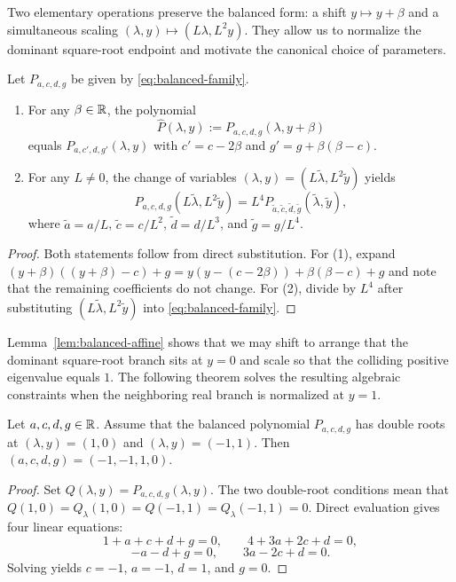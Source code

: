 Two elementary operations preserve the balanced form: a shift \(y\mapsto y+\beta\) and a simultaneous scaling \((\lambda,y)\mapsto(L\lambda,L^2 y)\).
They allow us to normalize the dominant square-root endpoint and motivate the canonical choice of parameters.

\begin{lemma}\label{lem:balanced-affine}
Let $P_{a,c,d,g}$ be given by \eqref{eq:balanced-family}.
\begin{enumerate}
\item For any $\beta\in\mathbb{R}$, the polynomial
\[
\widehat P(\lambda,y):=P_{a,c,d,g}(\lambda,y+\beta)
\]
equals $P_{a,c',d,g'}(\lambda,y)$ with $c'=c-2\beta$ and $g'=g+\beta(\beta-c)$.
\item For any $L\neq 0$, the change of variables $(\lambda,y)=(L\widetilde\lambda,L^2\widetilde y)$ yields
\[
P_{a,c,d,g}(L\widetilde\lambda,L^2\widetilde y)=L^4 P_{\widetilde a,\widetilde c,\widetilde d,\widetilde g}(\widetilde\lambda,\widetilde y),
\]
where $\widetilde a=a/L$, $\widetilde c=c/L^2$, $\widetilde d=d/L^3$, and $\widetilde g=g/L^4$.
\end{enumerate}
\end{lemma}

\begin{proof}
Both statements follow from direct substitution.
For (1), expand $(y+\beta)((y+\beta)-c)+g=y(y-(c-2\beta))+\beta(\beta-c)+g$ and note that the remaining coefficients do not change.
For (2), divide by $L^4$ after substituting $(L\widetilde\lambda,L^2\widetilde y)$ into \eqref{eq:balanced-family}.
\end{proof}

Lemma~\ref{lem:balanced-affine} shows that we may shift to arrange that the dominant square-root branch sits at $y=0$ and scale so that the colliding positive eigenvalue equals $1$.
The following theorem solves the resulting algebraic constraints when the neighboring real branch is normalized at $y=1$.

\begin{theorem}\label{thm:balanced-classification}
Let $a,c,d,g\in\mathbb{R}$.
Assume that the balanced polynomial $P_{a,c,d,g}$ has double roots at $(\lambda,y)=(1,0)$ and $(\lambda,y)=(-1,1)$.
Then $(a,c,d,g)=(-1,-1,1,0)$.
\end{theorem}

\begin{proof}
Set $Q(\lambda,y)=P_{a,c,d,g}(\lambda,y)$.
The two double-root conditions mean that $Q(1,0)=Q_\lambda(1,0)=Q(-1,1)=Q_\lambda(-1,1)=0$.
Direct evaluation gives four linear equations:
\[
1+a+c+d+g=0,\qquad
4+3a+2c+d=0,
\]
\[
-a-d+g=0,\qquad
3a-2c+d=0.
\]
Solving yields $c=-1$, $a=-1$, $d=1$, and $g=0$.
\end{proof}

